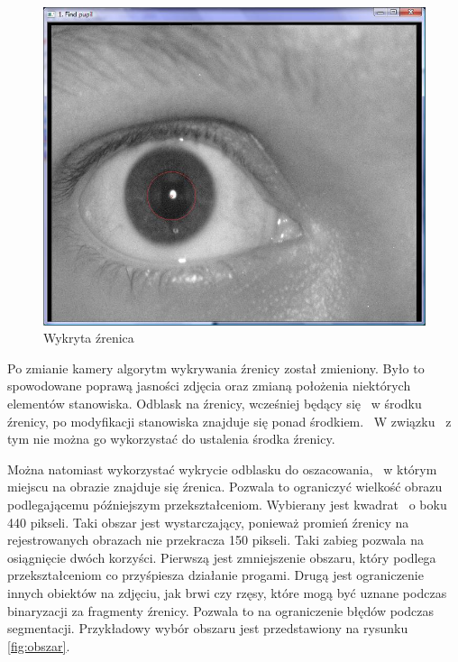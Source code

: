 \begin{figure}
\begin{center}
\includegraphics[scale=0.5]{zrenica.jpg}
\caption{Wykryta źrenica}
\label{fig:zrenicaNasza}
\end{center}
\end{figure}

Po zmianie kamery algorytm wykrywania źrenicy został zmieniony. Było to spowodowane poprawą jasności zdjęcia oraz zmianą położenia niektórych elementów stanowiska. Odblask na źrenicy, wcześniej będący się ~w środku źrenicy, po modyfikacji stanowiska znajduje się ponad środkiem. ~W związku ~z tym nie można go wykorzystać do ustalenia środka źrenicy.

Można natomiast wykorzystać wykrycie odblasku do oszacowania, ~w którym miejscu na obrazie znajduje się źrenica. Pozwala to ograniczyć wielkość obrazu podlegającemu późniejszym przekształceniom. Wybierany jest kwadrat ~o boku 440 pikseli. Taki obszar jest wystarczający, ponieważ promień źrenicy na rejestrowanych obrazach nie przekracza 150 pikseli. Taki zabieg pozwala na osiągnięcie dwóch korzyści. Pierwszą jest zmniejszenie obszaru, który podlega przekształceniom co przyśpiesza działanie progami. Drugą jest ograniczenie innych obiektów na zdjęciu, jak brwi czy rzęsy, które mogą być uznane podczas binaryzacji za fragmenty źrenicy. Pozwala to na ograniczenie błędów podczas segmentacji. Przykładowy wybór obszaru jest przedstawiony na rysunku \ref{fig:obszar}.

